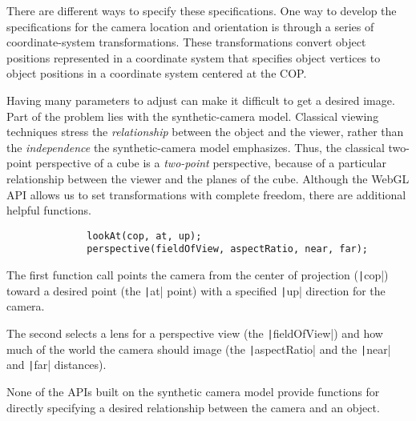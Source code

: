 \documentclass[../COS3712_Notes.tex]{subfiles}
\begin{document}
          There are different ways to specify these specifications.
          One way to develop the specifications for the camera location and orientation
          is through a series of coordinate-system transformations.
          These transformations convert object positions
          represented in a coordinate system that specifies object vertices
          to object positions in a coordinate system centered at the COP.

          Having many parameters to adjust can make it difficult to get a desired image.
          Part of the problem lies with the synthetic-camera model.
          Classical viewing techniques stress the
          \emph{relationship} between the object and the viewer,
          rather than the \emph{independence} the synthetic-camera model emphasizes.
          Thus, the classical two-point perspective of a cube is a \emph{two-point} perspective,
          because of a particular relationship between the viewer and the planes of the cube.
          Although the WebGL API allows us to set transformations with complete freedom,
          there are additional helpful functions.

          \begin{example}
            \vspace{-1em}
            \begin{verbatim}
              lookAt(cop, at, up);
              perspective(fieldOfView, aspectRatio, near, far);
            \end{verbatim}
            \vspace{-3em}

            The first function call points the camera from the center of projection
            (\texttt|cop|)
            toward a desired point
            (the \texttt|at| point)
            with a specified \texttt|up| direction for the camera.

            The second selects a lens for a perspective view
            (the \texttt|fieldOfView|)
            and how much of the world the camera should image
            (the \texttt|aspectRatio| and the \texttt|near| and
            \texttt|far| distances).
          \end{example}

          None of the APIs built on the synthetic camera model provide functions
          for directly specifying a desired relationship between the camera and an object.
\end{document}
